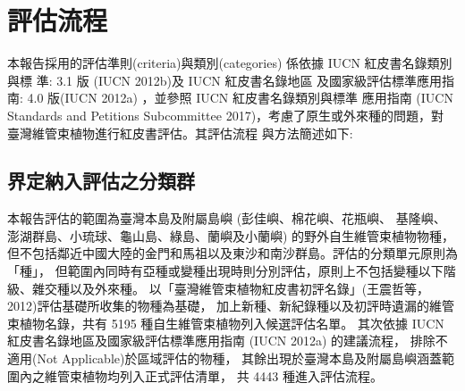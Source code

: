 \chapter{評估流程}
\begin{multicols}{2}

本報告採用的評估準則(criteria)與類別(categories) 係依據 IUCN 紅皮書名錄類別與標 準: 3.1 版 (IUCN 2012b)及 IUCN 紅皮書名錄地區 及國家級評估標準應用指南: 4.0 版(IUCN 2012a) ，並參照 IUCN 紅皮書名錄類別與標準 應用指南 (IUCN Standards and Petitions Subcommittee 2017)，考慮了原生或外來種的問題，對 臺灣維管束植物進行紅皮書評估。其評估流程 與方法簡述如下:
\end{multicols}
\section{界定納入評估之分類群}
\begin{multicols}{2}
本報告評估的範圍為臺灣本島及附屬島嶼 (彭佳嶼、棉花嶼、花瓶嶼、
基隆嶼、澎湖群島、小琉球、龜山島、綠島、蘭嶼及小蘭嶼) 的野外自生維管束植物物種，
但不包括鄰近中國大陸的金門和馬祖以及東沙和南沙群島。評估的分類單元原則為「種」，
但範圍內同時有亞種或變種出現時則分別評估，原則上不包括變種以下階級、雜交種以及外來種。
以「臺灣維管束植物紅皮書初評名錄」(王震哲等，2012)評估基礎所收集的物種為基礎，
加上新種、新紀錄種以及初評時遺漏的維管束植物名錄，共有 5195 種自生維管束植物列入候選評估名單。
其次依據 IUCN 紅皮書名錄地區及國家級評估標準應用指南 (IUCN 2012a) 的建議流程，
排除不適用(Not Applicable)於區域評估的物種，
其餘出現於臺灣本島及附屬島嶼涵蓋範圍內之維管束植物均列入正式評估清單，
共 4443 種進入評估流程。
\end{multicols}
